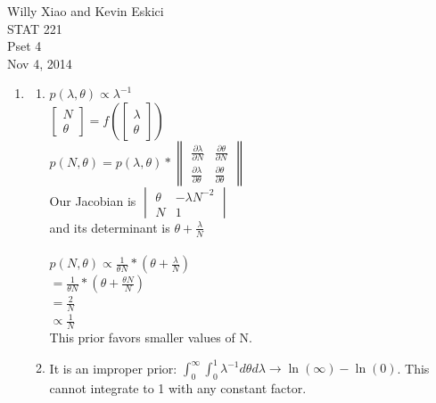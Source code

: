 \documentclass[paper=a4, fontsize=11pt]{scrartcl}
\newcommand{\parens}[1]{ \left( #1 \right) }
\begin{document}
\noindent Willy Xiao and Kevin Eskici \\ STAT 221 \\Pset 4\\ Nov 4, 2014
\begin{enumerate}
  \item
    \begin{enumerate}[1]
      
      \item   
      $p(\lambda, \theta) \propto \lambda^{-1}$\\
      $\begin{bmatrix} N \\ \theta \end{bmatrix} = f\parens{\begin{bmatrix} \lambda \\ \theta \end{bmatrix}}$\\
      $p(N, \theta) = p(\lambda, \theta) * \begin{Vmatrix}  \frac{\partial \lambda}{\partial N} &  \frac{\partial \theta}{\partial N} \\ \frac{\partial \lambda}{\partial \theta} &  \frac{\partial \theta}{\partial \theta} \end{Vmatrix}$\\
      Our Jacobian is $\begin{vmatrix} \theta & {-\lambda N^{-2}} \\N & 1 \end{vmatrix}$\\
      and its determinant is $\theta + \frac{\lambda}{N}$\\\\
      $p(N, \theta) \propto \frac{1}{\theta N} * (\theta + \frac{\lambda}{N})$\\
      $= \frac{1}{\theta N} * (\theta + \frac{\theta N}{N})$\\
      $= \frac{2}{N}$\\
      $\propto \frac{1}{N}$
      \\This prior favors smaller values of N.

      \item It is an improper prior: $\int_0^\infty{\int_0^1{\lambda^{-1}}}d\theta d\lambda \rightarrow \ln(\infty) - \ln(0)$. This cannot integrate to 1 with any constant factor.
	

\end{enumerate}
\end{enumerate}
\end{document}
